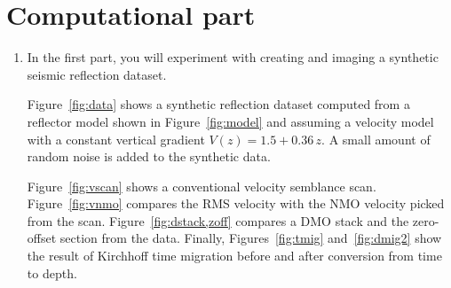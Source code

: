 \section{Computational part}

\begin{enumerate}
\item In the first part, you will experiment with creating and 
  imaging a synthetic seismic reflection dataset.



Figure~\ref{fig:data} shows a synthetic reflection dataset computed
from a reflector model shown in Figure~\ref{fig:model} and assuming a
velocity model with a constant vertical gradient $V(z) = 1.5 +
0.36\,z$. A small amount of random noise is added to the synthetic data.

Figure~\ref{fig:vscan} shows a conventional velocity semblance
scan. Figure~\ref{fig:vnmo} compares the RMS velocity with the NMO
velocity picked from the scan. Figure~\ref{fig:dstack,zoff} compares a
DMO stack and the zero-offset section from the data. Finally,
Figures~\ref{fig:tmig} and~\ref{fig:dmig2} show the result of
Kirchhoff time migration before and after conversion from time to
depth.


\end{enumerate}
